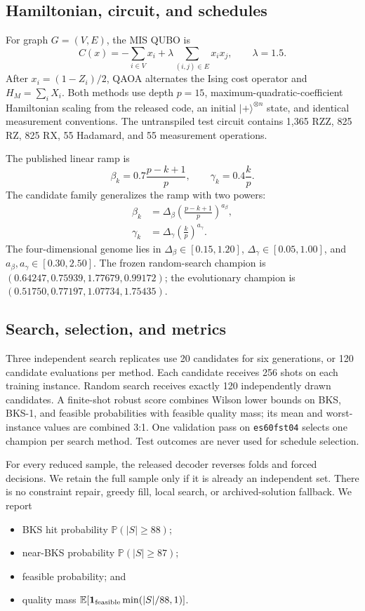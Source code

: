 \documentclass[10pt,twocolumn]{article}
\newcommand{\Prob}{\mathbb{P}}
\begin{document}
\subsection{Hamiltonian, circuit, and schedules}

For graph $G=(V,E)$, the MIS QUBO is
\begin{equation}
C(x)=-\sum_{i\in V}x_i+\lambda\sum_{(i,j)\in E}x_ix_j,
\qquad \lambda=1.5.
\end{equation}
After $x_i=(1-Z_i)/2$, QAOA alternates the Ising cost operator and
$H_M=\sum_i X_i$. Both methods use depth $p=15$, maximum-quadratic-coefficient
Hamiltonian scaling from the released code, an initial $|+\rangle^{\otimes n}$
state, and identical measurement conventions. The untranspiled test circuit
contains 1,365 RZZ, 825 RZ, 825 RX, 55 Hadamard, and 55 measurement operations.

The published linear ramp is
\begin{equation}
\beta_k=0.7\frac{p-k+1}{p},\qquad
\gamma_k=0.4\frac{k}{p}.
\end{equation}
The candidate family generalizes the ramp with two powers:
\begin{align}
\beta_k &= \Delta_\beta\left(\frac{p-k+1}{p}\right)^{a_\beta},\\
\gamma_k &= \Delta_\gamma\left(\frac{k}{p}\right)^{a_\gamma}.
\end{align}
The four-dimensional genome lies in
$\Delta_\beta\in[0.15,1.20]$, $\Delta_\gamma\in[0.05,1.00]$, and
$a_\beta,a_\gamma\in[0.30,2.50]$. The frozen random-search champion is
$(0.64247,0.75939,1.77679,0.99172)$; the evolutionary champion is
$(0.51750,0.77197,1.07734,1.75435)$.

\subsection{Search, selection, and metrics}

Three independent search replicates use 20 candidates for six generations,
or 120 candidate evaluations per method. Each candidate receives 256 shots on
each training instance. Random search receives exactly 120 independently drawn
candidates. A finite-shot robust score combines Wilson lower bounds on BKS,
BKS-1, and feasible probabilities with feasible quality mass; its mean and
worst-instance values are combined 3:1. One validation pass on
\texttt{es60fst04} selects one champion per search method. Test outcomes are
never used for schedule selection.

For every reduced sample, the released decoder reverses folds and forced
decisions. We retain the full sample only if it is already an independent set.
There is no constraint repair, greedy fill, local search, or archived-solution
fallback. We report
\begin{itemize}[leftmargin=*,nosep]
  \item BKS hit probability $\Prob(|S|\geq88)$;
  \item near-BKS probability $\Prob(|S|\geq87)$;
  \item feasible probability; and
  \item quality mass $\mathbb{E}[\mathbf{1}_{\rm feasible}\min(|S|/88,1)]$.
\end{itemize}
\end{document}
